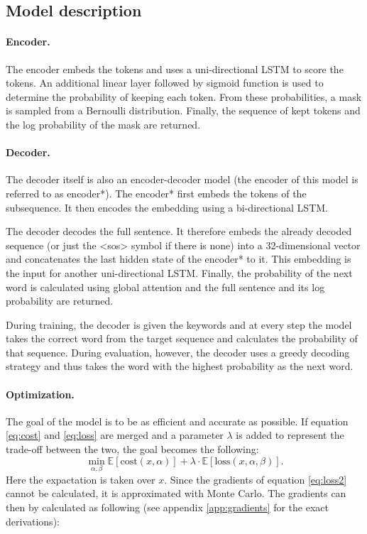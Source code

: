 \subsection{Model description}
\label{sec:model}
\paragraph{Encoder.} 
The encoder embeds the tokens and uses a uni-directional LSTM  to score the tokens.
An additional linear layer followed by sigmoid function is used to determine the probability of keeping each token. 
From these probabilities, a mask is sampled from a Bernoulli distribution. 
Finally, the sequence of kept tokens and the log probability of the mask are returned.

\paragraph{Decoder.} 
The decoder itself is also an encoder-decoder model (the encoder of this model is referred to as encoder*).
The encoder* first embeds the tokens of the subsequence.
It then encodes the embedding using a bi-directional LSTM. 

The decoder decodes the full sentence. 
It therefore embeds the already decoded sequence (or just the <sos> symbol if there is none) into a 32-dimensional vector and concatenates the last hidden state of the encoder* to it. 
This embedding is the input for another uni-directional LSTM. 
Finally, the probability of the next word is calculated using global attention  and the full sentence and its log probability are returned. 

During training, the decoder is given the keywords and at every step the model takes the correct word from the target sequence and calculates the probability of that sequence.
During evaluation, however, the decoder uses a greedy decoding strategy and thus takes the word with the highest probability as the next word. 

\paragraph{Optimization.} 
The goal of the model is to be as efficient and accurate as possible. 
If equation \ref{eq:cost} and \ref{eq:loss} are merged and a parameter $\lambda$ is added to represent the trade-off between the two, the goal becomes the following:
\begin{equation}
    \label{eq:loss2}
    \min_{\alpha, \beta} \mathbb{E} [\text{cost}(x, \alpha)] + \lambda \cdot \mathbb{E}[\text{loss}(x, \alpha, \beta)].
\end{equation}
Here the expactation is taken over $x$. 
Since the gradients of equation \ref{eq:loss2} cannot be calculated, it is approximated with Monte Carlo.
The gradients can then by calculated as following (see appendix \ref{app:gradients} for the exact derivations):

